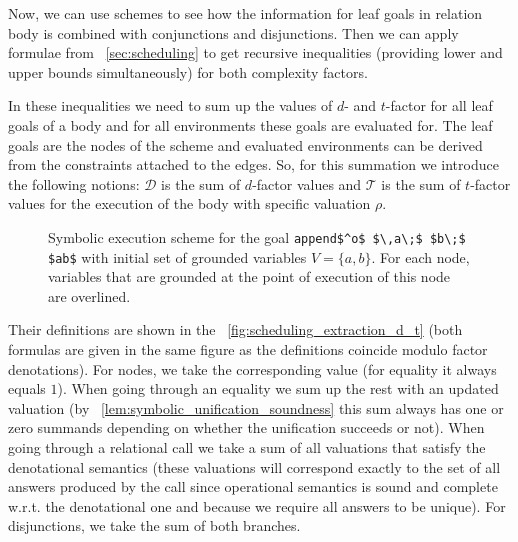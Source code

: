 Now, we can use schemes to see how the information for leaf goals in relation body is combined with conjunctions and disjunctions. Then we can apply formulae
from \sectionword~\ref{sec:scheduling} to get recursive inequalities (providing lower and upper bounds simultaneously) for both complexity factors.

In these inequalities we need to sum up the values of $d$- and $t$-factor for all leaf goals of a body and for all environments these goals are evaluated for.
The leaf goals are
the nodes of the scheme and evaluated environments can be derived from the constraints attached to the edges. So, for this summation we introduce the following notions: $\mathcal{D}$
is the sum of $d$-factor values and $\mathcal{T}$ is the sum of $t$-factor values for the execution of the body with specific valuation $\rho$.

\begin{wrapfigure}{r}{0.5\textwidth}
\begin{center}
\end{center}
\caption{Symbolic execution scheme for the goal  \lstinline|append$^o$ $\,a\;$ $b\;$ $ab$|  with initial set of grounded variables $V = \{ a, b \}$. For each node, variables that
  are grounded at the point of execution of this node are overlined. }
\label{fig:example_scheme}
\end{wrapfigure}

 Their definitions are shown in
the \figureword~\ref{fig:scheduling_extraction_d_t} (both formulas are given in the same figure as the definitions coincide modulo factor denotations). For nodes, we take
the corresponding value (for equality it always equals $1$). When going through an equality we sum up the rest with an updated valuation (by \lemmaword~\ref{lem:symbolic_unification_soundness}
this sum always has one or zero summands depending on whether the unification succeeds or not). When going through a relational call we take a sum of all valuations that satisfy the
denotational semantics (these valuations will correspond exactly to the set of all answers produced by the call since operational semantics is sound and complete w.r.t. the denotational
one and because we require all answers to be unique). For disjunctions, we take the sum of both branches.

